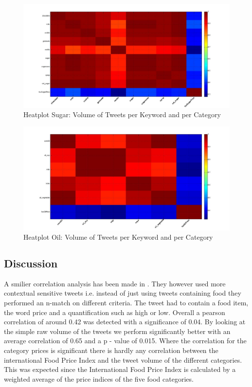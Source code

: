 \begin{figure}[H]
        \centering
         \includegraphics[width=1\textwidth ]{img/anal/sugar_heatplot}
              
        \caption{Heatplot Sugar: Volume of Tweets per Keyword and per Category}
        \label{fig:sugar_heat}
\end{figure}

\begin{figure}[H]
        \centering
         \includegraphics[width=1\textwidth ]{img/anal/oil_heatplot}
              
        \caption{Heatplot Oil: Volume of Tweets per Keyword and per Category}
        \label{fig:oil_heat}
\end{figure}


\subsection{Discussion} 

A smilier correlation analysis has been made in \cite{ungp2013}. They however used more contextual sensitive tweets i.e. instead of just using tweets containing food they performed an n-match on different criteria. The tweet had to contain a food item, the word price and a quantification such as high or low. Overall a pearson correlation of around 0.42 was detected with a significance of 0.04. By looking at the simple raw volume of the tweets we perform significantly better with an average correlation of 0.65 and a p - value of 0.015. Where the correlation for the category prices is significant there is hardly any correlation between the international Food Price Index and the tweet volume of the different categories. This was expected since the International Food Price Index is calculated by a weighted average of the price indices of the five food categories. 
 
